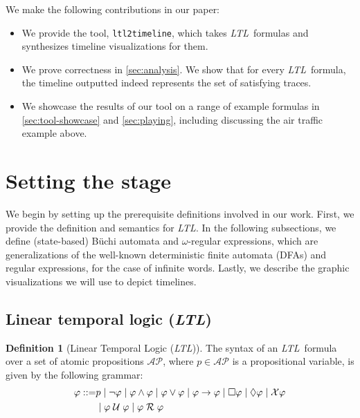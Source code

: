 \documentclass[conference]{IEEEtran}
\theoremstyle{definition}
\newtheorem{definition}{Definition}[section]
\theoremstyle{remark}
\newcommand{\AP}{\mathcal{AP}}
\newcommand{\always}{\Box}
\newcommand{\eventually}{\Diamond}
\newcommand{\nextt}{\mathcal{X}}
\newcommand{\limplies}{\rightarrow}
\newcommand{\ltl}{\textit{LTL}}
\newcommand{\Buchi}{B\"{u}chi }
\newcommand{\stronguntil}{\hspace{0.1cm} \mathcal{U}  \hspace{0.1cm}}
\newcommand{\weakrelease}{\hspace{0.1cm} \mathcal{R} \hspace{0.1cm}}
\newcommand{\tool}{\hspace{0.1cm}\texttt{ltl2timeline}}
\begin{document}
We make the following contributions in our paper:
\begin{itemize}
    \item We provide the tool, \tool, which takes \ltl\ formulas and synthesizes timeline visualizations for them.
    \item We prove correctness in \cref{sec:analysis}. We show that for every \ltl\ formula, the timeline outputted indeed represents the set of satisfying traces.
    \item We showcase the results of our tool on a range of example formulas in \cref{sec:tool-showcase} and \cref{sec:playing}, including discussing the air traffic example above.
\end{itemize}

\section{Setting the stage}

We begin by setting up the prerequisite definitions involved in our work.
First, we provide the definition and semantics for \ltl. In the following subsections, we define (state-based) \Buchi automata and $\omega$-regular expressions, which are generalizations of the well-known deterministic finite automata (DFAs) and regular expressions, for the case of infinite words. Lastly, we describe the graphic visualizations we will use to depict timelines.

\subsection{Linear temporal logic (\ltl)} \label{sec:ltl}

\begin{definition}[Linear Temporal Logic (\ltl)]
    The syntax of an \ltl\ formula over a set of atomic propositions $\AP$, where $p\in\AP$ is a propositional variable, is given by the following grammar:
    \begin{align*}
        \varphi ::= & p \mid \neg \varphi \mid \varphi \land \varphi \mid \varphi \lor \varphi \mid \varphi \limplies \varphi \mid \always \varphi \mid \eventually \varphi \mid \nextt \varphi \\ & \mid \varphi \stronguntil \varphi \mid \varphi \weakrelease \varphi
    \end{align*}\label{ltl-defn}
\end{definition}
\end{document}
